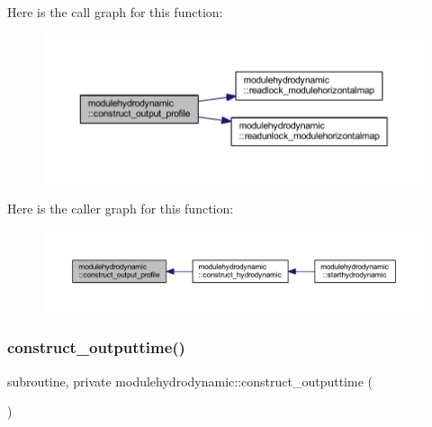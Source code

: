 Here is the call graph for this function\+:\nopagebreak
\begin{figure}[H]
\begin{center}
\leavevmode
\includegraphics[width=350pt]{namespacemodulehydrodynamic_aa3b8aa943159cc40b65537cff1888b6e_cgraph}
\end{center}
\end{figure}
Here is the caller graph for this function\+:\nopagebreak
\begin{figure}[H]
\begin{center}
\leavevmode
\includegraphics[width=350pt]{namespacemodulehydrodynamic_aa3b8aa943159cc40b65537cff1888b6e_icgraph}
\end{center}
\end{figure}
\mbox{\label{namespacemodulehydrodynamic_aea0ceff2b860562b897884814ae392d9}} 
\subsubsection{\texorpdfstring{construct\+\_\+outputtime()}{construct\_outputtime()}}
{\footnotesize\ttfamily subroutine, private modulehydrodynamic\+::construct\+\_\+outputtime (\begin{DoxyParamCaption}{ }\end{DoxyParamCaption})\hspace{0.3cm}{\ttfamily [private]}}

